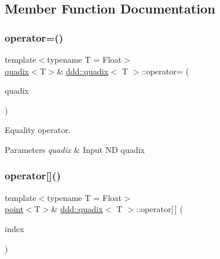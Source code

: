 \subsection{Member Function Documentation}
\mbox{\label{classddd_1_1quadix_a6a739b72a0bf5d07758c17cf5c2a08a7}} 
\subsubsection{\texorpdfstring{operator=()}{operator=()}}
{\footnotesize\ttfamily template$<$typename T = Float$>$ \\
\hyperlink{classddd_1_1quadix}{quadix}$<$T$>$\& \hyperlink{classddd_1_1quadix}{ddd\+::quadix}$<$ T $>$\+::operator= (\begin{DoxyParamCaption}\item[{const \hyperlink{classddd_1_1quadix}{quadix}$<$ T $>$ \&}]{quadix }\end{DoxyParamCaption})\hspace{0.3cm}{\ttfamily [inline]}}



Equality operator. 


\begin{DoxyParams}{Parameters}
{\em quadix} & Input ND quadix \\
\hline
\end{DoxyParams}
\mbox{\label{classddd_1_1quadix_a46ccfe1c37d09fd9fe0a7edb24a8d18f}} 
\subsubsection{\texorpdfstring{operator[]()}{operator[]()}\hspace{0.1cm}{\footnotesize\ttfamily [1/2]}}
{\footnotesize\ttfamily template$<$typename T = Float$>$ \\
\hyperlink{classddd_1_1point}{point}$<$T$>$\& \hyperlink{classddd_1_1quadix}{ddd\+::quadix}$<$ T $>$\+::operator\mbox{[}$\,$\mbox{]} (\begin{DoxyParamCaption}\item[{const std\+::size\+\_\+t \&}]{index }\end{DoxyParamCaption})\hspace{0.3cm}{\ttfamily [inline]}}




